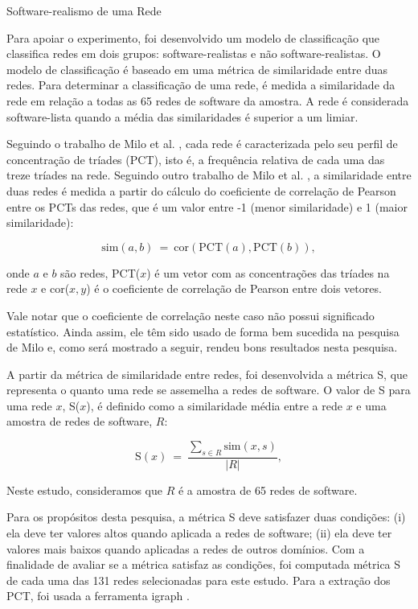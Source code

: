 \begin{section}{Software-realismo de uma Rede}

Para apoiar o experimento, foi desenvolvido um modelo de classificação que classifica redes em dois grupos: software-realistas e não software-realistas. O modelo de classificação é baseado em uma métrica de similaridade entre duas redes. Para determinar a classificação de uma rede, é medida a similaridade da rede em relação a todas as 65 redes de software da amostra. A rede é considerada software-lista quando a média das similaridades é superior a um limiar.
	
Seguindo o trabalho de Milo et al. \cite{Milo2002}, cada rede é caracterizada pelo seu perfil de concentração de tríades (PCT), isto é, a frequência relativa de cada uma das treze tríades na rede. Seguindo outro trabalho de Milo et al. \cite{Milo2004}, a similaridade entre duas redes é medida a partir do cálculo do coeficiente de correlação de Pearson entre os PCTs das redes, que é um valor entre -1 (menor similaridade) e 1 (maior similaridade):

$$
\mathrm{sim}(a, b) ~=~ 
  \mathrm{cor}(\mathrm{PCT}(a), \mathrm{PCT}(b))\mathrm{,}
$$

onde $a$ e $b$ são redes, PCT($x$) é um vetor com as concentrações das tríades na rede $x$ e cor($x, y$) é o coeficiente de correlação de Pearson entre dois vetores.

Vale notar que o coeficiente de correlação neste caso não possui significado estatístico. Ainda assim, ele têm sido usado de forma bem sucedida na pesquisa de Milo e, como será mostrado a seguir, rendeu bons resultados nesta pesquisa.

A partir da métrica de similaridade entre redes, foi desenvolvida a métrica S, que representa o quanto uma rede se assemelha a redes de software. O valor de S para uma rede $x$, S($x$), é definido como a similaridade média entre a rede $x$ e uma amostra de redes de software, $R$:

$$
\mathrm{S}(x) ~=~ \frac{
\displaystyle\sum_{s \in R} \mathrm{sim}(x, s)
}{|R|} \mathrm{,}
$$

Neste estudo, consideramos que $R$ é a amostra de 65 redes de software.

Para os propósitos desta pesquisa, a métrica S deve satisfazer duas condições: (i) ela deve ter valores altos quando aplicada a redes de software; (ii) ela deve ter valores mais baixos quando aplicadas a redes de outros domínios. Com a finalidade de avaliar se a métrica satisfaz as condições, foi computada métrica S de cada uma das 131 redes selecionadas para este estudo. Para a extração dos PCT, foi usada a ferramenta igraph \cite{igraph}.


\end{section}
